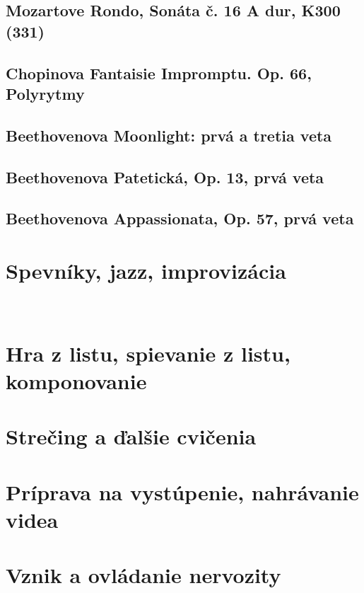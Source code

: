 \documentclass[11pt,a4paper]{book}
\begin{document}
\subsection{Mozartove Rondo, Sonáta č. 16 A dur, K300 (331)}\label{s:mozart-rondo}

\subsection{Chopinova Fantaisie Impromptu. Op. 66, Polyrytmy}\label{s:chopin-impromptu}

\subsection{Beethovenova Moonlight: prvá a tretia veta}\label{s:beethoven-moonlight}

\subsection{Beethovenova Patetická, Op. 13, prvá veta}\label{s:beethoven-patetique}

\subsection{Beethovenova Appassionata, Op. 57, prvá veta}\label{s:beethoven-apassionata}

\section{Spevníky, jazz, improvizácia}\label{s:fake-books}
\ 
\section{Hra z listu, spievanie z listu, komponovanie}\label{s:sight-reading}

\section{Strečing a ďalšie cvičenia}\label{s:stretching}

\section{Príprava na vystúpenie, nahrávanie videa}\label{s:performance-preparation}

\section{Vznik a ovládanie nervozity}\label{s:origin-nervousness}
\end{document}
